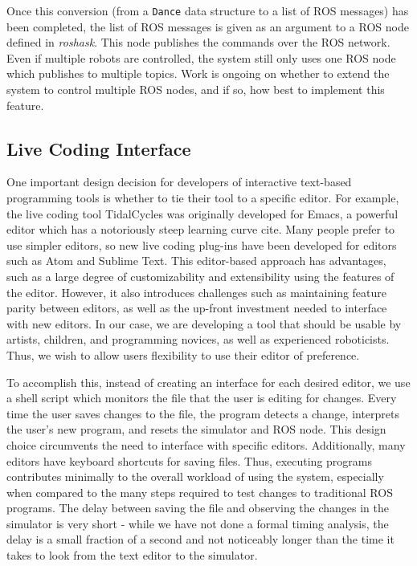 \documentclass[sigconf]{acmart}
\begin{document}
Once this conversion (from a \texttt{Dance} data structure to a list of ROS messages)
has been completed, the list of ROS messages is given as an argument to a ROS
node defined in \emph{roshask}. This node publishes the commands over the ROS network.
Even if multiple robots are controlled, the system still only uses one ROS node
which publishes to multiple topics. Work is ongoing on whether to extend the
system to control multiple ROS nodes, and if so, how best to implement this
feature.

\subsection{Live Coding Interface}\label{live-coding-interface}

One important design decision for developers of interactive text-based
programming tools is whether to tie their tool to a specific editor. For
example, the live coding tool TidalCycles was originally
developed for Emacs, a powerful editor which has a notoriously steep
learning curve {\color{red} cite}. Many people prefer to use simpler editors, so new
live coding plug-ins have been developed for editors such as Atom and
Sublime Text. This editor-based approach has advantages, such as a large
degree of customizability and extensibility using the features of the
editor. However, it also introduces challenges such as maintaining
feature parity between editors, as well as the up-front investment
needed to interface with new editors. In our case, we are developing a
tool that should be usable by artists, children, and programming
novices, as well as experienced roboticists. Thus, we wish to allow
users flexibility to use their editor of preference.

To accomplish this, instead of creating an interface for each desired
editor, we use a shell script which monitors the file that the user is
editing for changes. Every time the user saves changes to the file, the
program detects a change, interprets the user's new program, and resets
the simulator and ROS node. This design choice circumvents the need to
interface with specific editors. Additionally, many editors have
keyboard shortcuts for saving files. Thus, executing programs
contributes minimally to the overall workload of using the system,
especially when compared to the many steps required to test changes to
traditional ROS programs. The delay between saving the file and observing the
changes in the simulator is very short - while we have not done a formal timing
analysis, the delay is a small fraction of a second and not noticeably longer than the
time it takes to look from the text editor to the simulator.
\end{document}
